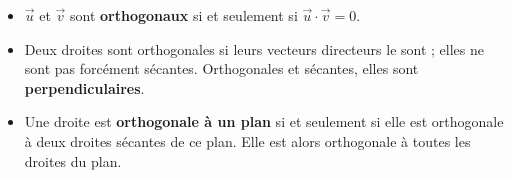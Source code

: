 \noindent
\begin{minipage}[c]{0.6\linewidth}
\begin{propriete}
\raggedright
\begin{itemize}[leftmargin=1.2em,itemsep=0.4mm,topsep=0.3mm]
  \item $\vec u$ et $\vec v$ sont \textbf{orthogonaux} si et seulement si $\vec u\cdot\vec v=0$.
  \item Deux droites sont orthogonales si leurs vecteurs directeurs le sont ; elles ne sont pas forcément sécantes. Orthogonales et
    sécantes, elles sont \textbf{perpendiculaires}.
  \item Une droite est \textbf{orthogonale à un plan} si et seulement si elle est orthogonale à deux droites sécantes de ce plan.
    Elle est alors orthogonale à toutes les droites du plan.
\end{itemize}
\end{propriete}
\end{minipage}\hfill
\begin{minipage}[c]{0.36\linewidth}
\centering
{}\\[0.5mm]
\end{minipage}


